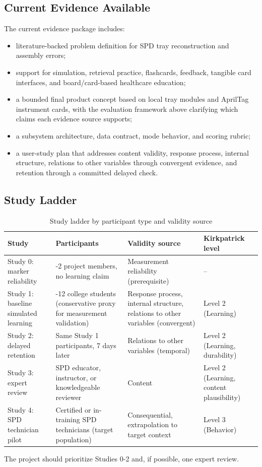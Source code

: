 \documentclass[10pt,a4paper]{article}
\begin{document}
\subsection{Current Evidence Available}

The current evidence package includes:
\begin{itemize}
  \item literature-backed problem definition for SPD tray reconstruction and assembly errors;
  \item support for simulation, retrieval practice, flashcards, feedback, tangible card interfaces, and board/card-based healthcare education;
  \item a bounded final product concept based on local tray modules and AprilTag instrument cards, with the evaluation framework above clarifying which claims each evidence source supports;
  \item a subsystem architecture, data contract, mode behavior, and scoring rubric;
  \item a user-study plan that addresses content validity, response process, internal structure, relations to other variables through convergent evidence, and retention through a committed delayed check.
\end{itemize}
\subsection{Study Ladder}
\label{sec:study-ladder}

\begin{table}[!htb]
\centering
\caption{Study ladder by participant type and validity source}
\label{tab:study-ladder-by-participant-type-and-claim-supported}
\small\renewcommand{\arraystretch}{1.2}\setlength{\tabcolsep}{4pt}
\begin{tabularx}{\textwidth}{|>{\raggedright\arraybackslash}X|>{\raggedright\arraybackslash}X|>{\raggedright\arraybackslash}X|>{\raggedright\arraybackslash}X|}
\hline
Study & Participants & Validity source & Kirkpatrick level \\
\hline
Study 0: marker reliability & 1-2 project members, no learning claim & Measurement reliability (prerequisite) & -- \\
\hline
Study 1: baseline simulated learning & 8-12 college students (conservative proxy for measurement validation) & Response process, internal structure, relations to other variables (convergent) & Level 2 (Learning) \\
\hline
Study 2: delayed retention & Same Study 1 participants, 7 days later & Relations to other variables (temporal) & Level 2 (Learning, durability) \\
\hline
Study 3: expert review & 1 SPD educator, instructor, or knowledgeable reviewer & Content & Level 2 (Learning, content plausibility) \\
\hline
Study 4: SPD technician pilot & Certified or in-training SPD technicians (target population) & Consequential, extrapolation to target context & Level 3 (Behavior) \\
\hline
\end{tabularx}
\end{table}
The project should prioritize Studies 0-2 and, if possible, one expert review.
\end{document}
